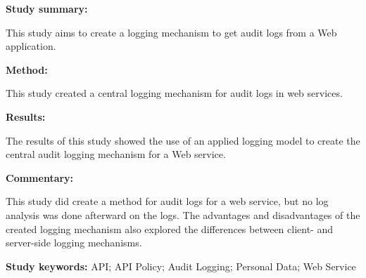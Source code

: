 \begin{tcolorbox}[colback=gray!5!white, colframe=pastelgreen!40!black, title=Central Audit Logging Mechanism in Personal Data Web Services\cite{Hasiloglu2018}]
	\begin{minipage}[t]{0.25\textwidth}
		\textbf{Study summary:}
	\end{minipage}
	\hfill
	\begin{minipage}[t]{0.65\textwidth}
		This study aims to create a logging mechanism to get audit logs from a Web application.
	\end{minipage}

	\vspace{0.75em} 

	\begin{minipage}[t]{0.25\textwidth}
		\textbf{Method:}
	\end{minipage}
	\hfill
	\begin{minipage}[t]{0.65\textwidth}
		This study created a central logging mechanism for audit logs in web services.
	\end{minipage}

	\vspace{0.75em} 

	\begin{minipage}[t]{0.25\textwidth}
		\textbf{Results:}
	\end{minipage}
	\hfill
	\begin{minipage}[t]{0.65\textwidth}
		The results of this study showed the use of an applied logging model to create the central audit logging mechanism for a Web service.	
	\end{minipage}

	\vspace{0.75em} 

	\begin{minipage}[t]{0.25\textwidth}
		\textbf{Commentary:}
	\end{minipage}
	\hfill
	\begin{minipage}[t]{0.65\textwidth}
		This study did create a method for audit logs for a web service, but no log analysis was done afterward on the logs. The advantages and disadvantages of the created logging mechanism also explored the differences between client- and server-side logging mechanisms. 
	\end{minipage}
	\tcblower
	\textbf{Study keywords:} API; API Policy; Audit Logging; Personal Data; Web Service
\end{tcolorbox}

